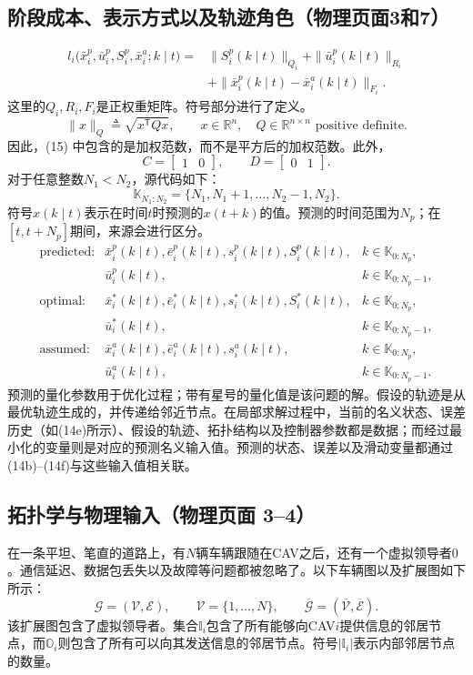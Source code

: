 \documentclass{article}
\begin{document}
\subsection*{阶段成本、表示方式以及轨迹角色（物理页面3和7）}
\begin{equation}
\begin{split}
l_i\bigl(\bar x_i^p,\bar u_i^p,S_i^p,\bar x_i^a;k\mid t\bigr)
={}&\|S_i^p(k\mid t)\|_{Q_i}
 +\|\bar u_i^p(k\mid t)\|_{R_i}\\
&+\|\bar x_i^p(k\mid t)-\bar x_i^a(k\mid t)\|_{F_i}.
\end{split}\tag{15}
\end{equation}
这里的$Q_i,R_i,F_i$是正权重矩阵。符号部分进行了定义。
\[
\|x\|_Q\triangleq\sqrt{x^{\mathsf T}Qx},
\qquad x\in\mathbb R^n,\quad Q\in\mathbb R^{n\times n}
\text{ positive definite}.
\]
因此，(15) 中包含的是加权范数，而不是平方后的加权范数。此外，
\[
C=\begin{bmatrix}1&0\end{bmatrix},\qquad
D=\begin{bmatrix}0&1\end{bmatrix}.
\]
对于任意整数$N_1<N_2$，源代码如下：
\[
\mathbb K_{N_1:N_2}=\{N_1,N_1+1,\ldots,N_2-1,N_2\}.
\]
符号$x(k\mid t)$表示在时间$t$时预测的$x(t+k)$的值。预测的时间范围为$N_p$；在$[t,t+N_p]$期间，来源会进行区分。
\[
\begin{array}{lll}
\text{predicted:}&
\bar x_i^p(k\mid t),\bar e_i^p(k\mid t),s_i^p(k\mid t),S_i^p(k\mid t),
&k\in\mathbb K_{0:N_p},\\
&\bar u_i^p(k\mid t),&k\in\mathbb K_{0:N_p-1},\\[2pt]
\text{optimal:}&
\bar x_i^*(k\mid t),\bar e_i^*(k\mid t),s_i^*(k\mid t),S_i^*(k\mid t),
&k\in\mathbb K_{0:N_p},\\
&\bar u_i^*(k\mid t),&k\in\mathbb K_{0:N_p-1},\\[2pt]
\text{assumed:}&
\bar x_i^a(k\mid t),\bar e_i^a(k\mid t),s_i^a(k\mid t),
&k\in\mathbb K_{0:N_p},\\
&\bar u_i^a(k\mid t),&k\in\mathbb K_{0:N_p-1}.
\end{array}
\]
预测的量化参数用于优化过程；带有星号的量化值是该问题的解。假设的轨迹是从最优轨迹生成的，并传递给邻近节点。在局部求解过程中，当前的名义状态、误差历史（如(14e)所示）、假设的轨迹、拓扑结构以及控制器参数都是数据；而经过最小化的变量则是对应的预测名义输入值。预测的状态、误差以及滑动变量都通过(14b)--(14f)与这些输入值相关联。

\subsection*{拓扑学与物理输入（物理页面 3–4）}
在一条平坦、笔直的道路上，有$N$辆车辆跟随在CAV之后，还有一个虚拟领导者$0$。通信延迟、数据包丢失以及故障等问题都被忽略了。以下车辆图以及扩展图如下所示：
\[
\mathscr G=(\mathscr V,\mathscr E),\qquad
\mathscr V=\{1,\ldots,N\},\qquad
\overline{\mathscr G}=(\overline{\mathscr V},\overline{\mathscr E}).
\]
该扩展图包含了虚拟领导者。集合$\mathbb I_i$包含了所有能够向CAV$i$提供信息的邻居节点，而$\mathbb O_i$则包含了所有可以向其发送信息的邻居节点。符号$|\mathbb I_i|$表示内部邻居节点的数量。
\end{document}
